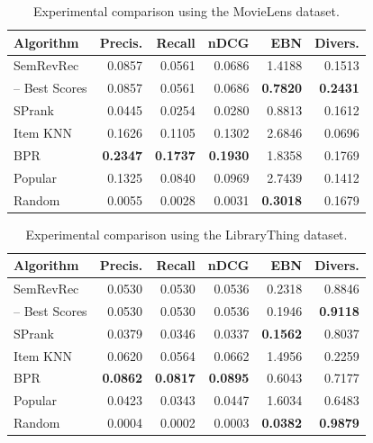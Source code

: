 \begin{table}
\centering
\begin{tabular}{@{}lrrrrr@{}}
\toprule
Algorithm & Precis. & Recall & nDCG   & EBN    & Divers. \\ \midrule
SemRevRec & 0.0857  & 0.0561 & 0.0686 & 1.4188 & 0.1513 \\
-- Best Scores & 0.0857 & 0.0561 & 0.0686 & \textbf{0.7820} & \textbf{0.2431} \\ \midrule
SPrank    & 0.0445  & 0.0254 & 0.0280 & 0.8813 & 0.1612 \\
Item KNN  & 0.1626  & 0.1105 & 0.1302 & 2.6846 & 0.0696 \\
BPR       & \textbf{0.2347}  & \textbf{0.1737} & \textbf{0.1930} & 1.8358 & 0.1769 \\
Popular   & 0.1325  & 0.0840 & 0.0969 & 2.7439 & 0.1412 \\
Random    & 0.0055  & 0.0028 & 0.0031 & \textbf{0.3018} & 0.1679 \\ \bottomrule
\end{tabular}
\caption[Comparison using the MovieLens dataset]{Experimental comparison using the MovieLens dataset.}
\label{srr:tab:ex2-ml}
\end{table}

\begin{table}
\centering
\begin{tabular}{@{}lrrrrr@{}}
\toprule
Algorithm & Precis. & Recall & nDCG   & EBN    & Divers. \\ \midrule
SemRevRec & 0.0530  & 0.0530 & 0.0536 & 0.2318 & 0.8846 \\
-- Best Scores & 0.0530  & 0.0530 & 0.0536 & 0.1946 & \textbf{0.9118} \\ \midrule
SPrank    & 0.0379  & 0.0346 & 0.0337 & \textbf{0.1562} & 0.8037 \\
Item KNN  & 0.0620  & 0.0564 & 0.0662 & 1.4956 & 0.2259 \\
BPR       & \textbf{0.0862}  & \textbf{0.0817} & \textbf{0.0895} & 0.6043 & 0.7177 \\
Popular   & 0.0423  & 0.0343 & 0.0447 & 1.6034 & 0.6483 \\
Random    & 0.0004  & 0.0002 & 0.0003 & \textbf{0.0382} & \textbf{0.9879} \\ \bottomrule
\end{tabular}
\caption[Comparison using the LibraryThing dataset]{Experimental comparison using the LibraryThing dataset.}
\label{srr:tab:ex2-lt}
\end{table}

